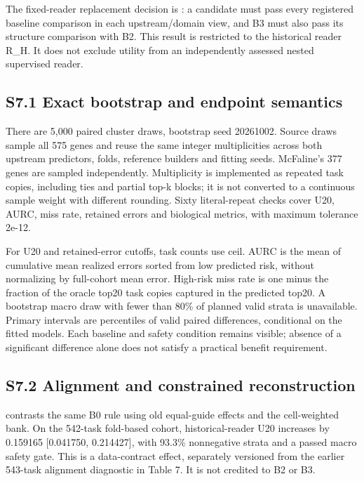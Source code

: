 \documentclass[journal,onecolumn]{IEEEtran}
\begin{document}
The fixed-reader replacement decision is \texttt{}: a candidate must pass every registered baseline comparison in each upstream/domain view, and B3 must also pass its structure comparison with B2. This result is restricted to the historical reader R\_H. It does not exclude utility from an independently assessed nested supervised reader.


\subsection{S7.1 Exact bootstrap and endpoint semantics}

There are 5,000 paired cluster draws, bootstrap seed 20261002. Source draws sample all 575 genes and reuse the same integer multiplicities across both upstream predictors, folds, reference builders and fitting seeds. McFaline's 377 genes are sampled independently. Multiplicity is implemented as repeated task copies, including ties and partial top-k blocks; it is not converted to a continuous sample weight with different rounding. Sixty literal-repeat checks cover U20, AURC, miss rate, retained errors and biological metrics, with maximum tolerance 2e-12.


For U20 and retained-error cutoffs, task counts use ceil. AURC is the mean of cumulative mean realized errors sorted from low predicted risk, without normalizing by full-cohort mean error. High-risk miss rate is one minus the fraction of the oracle top20 task copies captured in the predicted top20. A bootstrap macro draw with fewer than 80\% of planned valid strata is unavailable. Primary intervals are percentiles of valid paired differences, conditional on the fitted models. Each baseline and safety condition remains visible; absence of a significant difference alone does not satisfy a practical benefit requirement.


\subsection{S7.2 Alignment and constrained reconstruction}

\texttt{} contrasts the same B0 rule using old equal-guide effects and the cell-weighted bank. On the 542-task fold-based cohort, historical-reader U20 increases by 0.159165 [0.041750, 0.214427], with 93.3\% nonnegative strata and a passed macro safety gate. This is a data-contract effect, separately versioned from the earlier 543-task alignment diagnostic in Table 7. It is not credited to B2 or B3.
\end{document}
